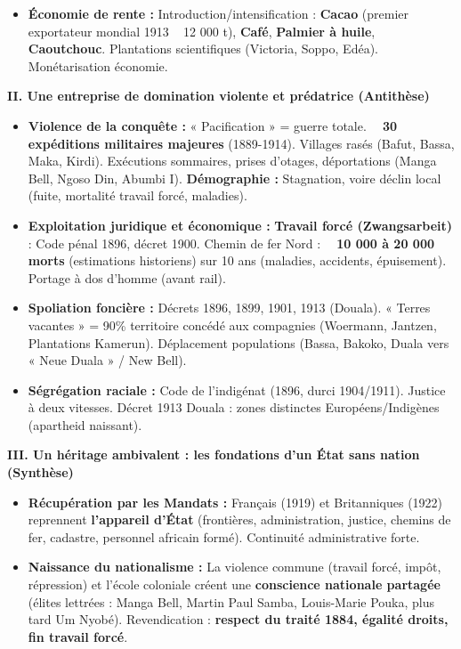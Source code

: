 \documentclass[11pt]{article}
\begin{document}
\begin{exoresolu}
\begin{itemize}
    \item \textbf{Économie de rente :} Introduction/intensification : \textbf{Cacao} (premier exportateur mondial 1913 ~ 12 000 t), \textbf{Café}, \textbf{Palmier à huile}, \textbf{Caoutchouc}. Plantations scientifiques (Victoria, Soppo, Edéa). Monétarisation économie.
\end{itemize}
\textbf{II. Une entreprise de domination violente et prédatrice (Antithèse)}
\begin{itemize}
    \item \textbf{Violence de la conquête :} « Pacification » = guerre totale. \textbf{~ 30 expéditions militaires majeures} (1889-1914). Villages rasés (Bafut, Bassa, Maka, Kirdi). Exécutions sommaires, prises d'otages, déportations (Manga Bell, Ngoso Din, Abumbi I). \textbf{Démographie :} Stagnation, voire déclin local (fuite, mortalité travail forcé, maladies).
    \item \textbf{Exploitation juridique et économique :} \textbf{Travail forcé (Zwangsarbeit)} : Code pénal 1896, décret 1900. Chemin de fer Nord : \textbf{~ 10 000 à 20 000 morts} (estimations historiens) sur 10 ans (maladies, accidents, épuisement). Portage à dos d'homme (avant rail).
    \item \textbf{Spoliation foncière :} Décrets 1896, 1899, 1901, 1913 (Douala). « Terres vacantes » = 90\% territoire concédé aux compagnies (Woermann, Jantzen, Plantations Kamerun). Déplacement populations (Bassa, Bakoko, Duala vers « Neue Duala » / New Bell).
    \item \textbf{Ségrégation raciale :} Code de l'indigénat (1896, durci 1904/1911). Justice à deux vitesses. Décret 1913 Douala : zones distinctes Européens/Indigènes (apartheid naissant).
\end{itemize}
\textbf{III. Un héritage ambivalent : les fondations d'un État sans nation (Synthèse)}
\begin{itemize}
    \item \textbf{Récupération par les Mandats :} Français (1919) et Britanniques (1922) reprennent \textbf{l'appareil d'État} (frontières, administration, justice, chemins de fer, cadastre, personnel africain formé). Continuité administrative forte.
    \item \textbf{Naissance du nationalisme :} La violence commune (travail forcé, impôt, répression) et l'école coloniale créent une \textbf{conscience nationale partagée} (élites lettrées : Manga Bell, Martin Paul Samba, Louis-Marie Pouka, plus tard Um Nyobé). Revendication : \textbf{respect du traité 1884, égalité droits, fin travail forcé}.

\end{itemize}
\end{exoresolu}
\end{document}

